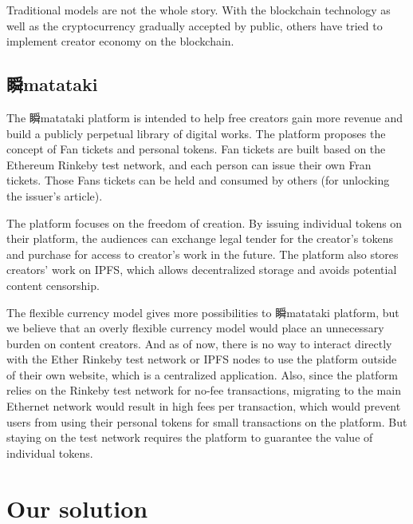 \documentclass[12pt,a4paper]{article}
\begin{document}
    Traditional models are not the whole story. With the blockchain technology
    as well as the cryptocurrency gradually accepted by public, others have tried
    to implement creator economy on the blockchain.

    \subsection{瞬matataki}\label{subsec:blockchain_matataki}

    The 瞬matataki platform is intended to help free creators
    gain more revenue and build a publicly perpetual library of
    digital works. The platform proposes the concept of
    Fan tickets and personal tokens. Fan tickets are built based
    on the Ethereum Rinkeby test network, and each person can issue
    their own Fran tickets. Those Fans tickets can be held and consumed
    by others (for unlocking the issuer's article)\cite{mitataki_fan_ticket}.

    The platform focuses on the freedom of creation. By issuing
    individual tokens on their platform, the audiences can exchange legal tender
    for the creator's tokens and purchase for access to creator's work in the future.
    The platform also stores creators' work on IPFS\cite{ipfs},
    which allows decentralized storage and avoids potential content censorship.

    The flexible currency model gives more possibilities to 瞬matataki platform,
    but we believe that an overly flexible currency model would place an
    unnecessary burden on content creators. And as of now, there is no way to
    interact directly with the Ether Rinkeby test network or IPFS nodes to use
    the platform outside of their own website, which is a centralized application.
    Also, since the platform relies on the Rinkeby test network for no-fee
    transactions, migrating to the main Ethernet network would result in high
    fees per transaction, which would prevent users from using their personal
    tokens for small transactions on the platform. But staying on the test network
    requires the platform to guarantee the value of individual tokens.


    \section{Our solution}\label{sec:solution}
\end{document}
